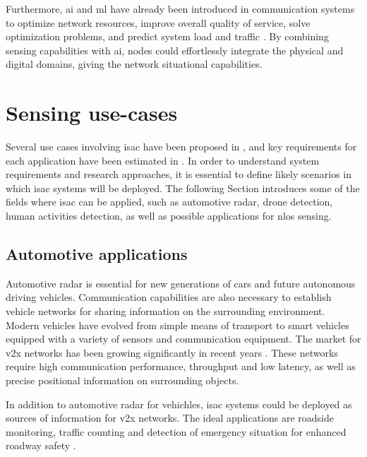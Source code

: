 	 Furthermore, \gls{ai} and \gls{ml} have already been introduced in communication systems to optimize network resources, improve overall quality of service, solve optimization problems, and predict system load and traffic \cite{30_years_ai_survey}. 
	 By combining sensing capabilities with \gls{ai}, nodes could effortlessly integrate the physical and digital domains, giving the network situational capabilities.
	



	


\section{Sensing use-cases}

	Several use cases involving \gls{isac} have been proposed in \cite{Mandelli_Henninger_Bauhofer_Wild_2023}, \cite{Wang_Varshney_Gentile_Blandino_Chuang_Golmie_2022} and  key requirements for each application have been estimated in \cite{Wild_Braun_Viswanathan_2021}.
	In order to understand system requirements and research approaches, it is essential to define likely scenarios in which \gls{isac} systems will be deployed. The following Section introduces some of the fields where \gls{isac} can be applied, such as automotive radar, drone detection, human activities detection, as well as possible applications for \gls{nlos} sensing.
	
	
	\subsection{Automotive applications}
	
	Automotive radar is essential for new generations of cars and future autonomous driving vehicles.
	Communication capabilities are also necessary to establish vehicle networks for sharing information on the surrounding environment.
	Modern vehicles have evolved from simple means of transport to smart vehicles equipped with a variety of sensors and communication equipment.
	The market for \gls{v2x} networks has been growing significantly in recent years \cite{Liu_Masouros_2021}.
	These networks require high communication performance, throughput and low latency, as well as precise positional information on surrounding objects.
	
	In addition to automotive radar for vehichles, \gls{isac} systems could be deployed as sources of information for \gls{v2x} networks. The ideal applications are roadside monitoring, traffic counting and detection of emergency situation for enhanced roadway safety \cite{Mandelli_Henninger_Bauhofer_Wild_2023}.
	
